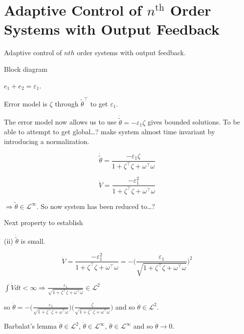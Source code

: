 \section{Adaptive Control of \texorpdfstring{$n^{\text{th}}$}{nth} Order Systems with Output Feedback}

Adaptive control of $nth$ order systems with output feedback.

Block diagram

$e_{1}+e_{2}=\varepsilon_{1}$.

Error model is $\zeta$ through $\tilde{\theta}^{\top}$ to get $\varepsilon_{1}$.

The error model now allows us to use $\dot{\tilde{\theta}}=-\varepsilon_{1}\zeta$ gives bounded solutions.
To be able to attempt to get global\ldots? make system almost time invariant by introducing a normalization.

\begin{equation*}
\dot{\tilde{\theta}}=\frac{-\varepsilon_{1}\zeta}{1+\zeta^{\top}\zeta+\omega^{\top}\omega}
\end{equation*}

\begin{equation*}
\dot{V}=\frac{-\varepsilon_{1}^{2}}{1+\zeta^{\top}\zeta+\omega^{\top}\omega}
\end{equation*}

$\Rightarrow\tilde{\theta}\in\mathcal{L}^{\infty}$.
So now system has been reduced to\ldots?

Next property to establish

(ii) $\dot{\tilde{\theta}}$ is small.

\begin{equation*}
  \dot{V}
  =\frac{-\varepsilon_{1}^{2}}{1+\zeta^{\top}\zeta+\omega^{\top}\omega}
  =-\biggr(\frac{\varepsilon_{1}}{\sqrt{1+\zeta^{\top}\zeta+\omega^{\top}\omega}}\biggr)^{2}
\end{equation*}

$\int\dot{V} dt<\infty\Rightarrow\frac{\varepsilon_{1}}{\sqrt{1+\zeta^{\top}\zeta+\omega^{\top}\omega}}\in\mathcal{L}^{2}$

so $\dot{\theta}=-\biggr(\frac{\varepsilon_{1}}{\sqrt{1+\zeta^{\top}\zeta+\omega^{\top}\omega}}\biggr)\biggr(\frac{\zeta}{\sqrt{1+\zeta^{\top}\zeta+\omega^{\top}\omega}}\biggr)$ and so $\dot{\theta}\in\mathcal{L}^{2}$.

Barbalat's lemma $\dot{\theta}\in\mathcal{L}^{2}$, $\dot{\theta}\in\mathcal{L}^{\infty}$, $\ddot{\theta}\in\mathcal{L}^{\infty}$ and so $\dot{\theta}\rightarrow0$.

